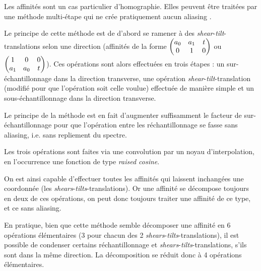 Les affinités sont un cas particulier d'homographie. Elles peuvent être traitées par une méthode multi-étape qui ne crée pratiquement aucun aliasing \cite{szeliski2010high}.

Le principe de cette méthode est de d'abord se ramener à des \emph{shear}-\emph{tilt}-translations selon une direction (affinités de la forme
$\begin{pmatrix} a_0 & a_1 & t\\ 0 & 1 & 0 \end{pmatrix}$ ou $\begin{pmatrix} 1 & 0 & 0\\ a_1 & a_0 & t \end{pmatrix}$). Ces opérations sont alors effectuées en trois étapes : un sur-échantillonnage dans la direction transverse, une opération \emph{shear}-\emph{tilt}-translation (modifié pour que l'opération soit celle voulue) effectuée de manière simple et un sous-échantillonnage dans la direction transverse.

Le principe de la méthode est en fait d'augmenter suffisamment le facteur de sur-échantillonnage pour que l'opération entre les réchantillonnage se fasse sans aliasing, i.e. sans repliement du spectre.

Les trois opérations sont faites via une convolution par un noyau d'interpolation, en l'occurrence une fonction de type \emph{raised cosine}.

On est ainsi capable d'effectuer toutes les affinités qui laissent inchangées une coordonnée (les \emph{shears}-\emph{tilts}-translations). Or une affinité se décompose toujours en deux de ces opérations, on peut donc toujours traiter une affinité de ce type, et ce sans aliasing.

En pratique, bien que cette méthode semble décomposer une affinité en 6 opérations élémentaires (3 pour chacun des 2 \emph{shears}-\emph{tilts}-translations), il est possible de condenser certains réchantillonnage et \emph{shears}-\emph{tilts}-translations, s'ils sont dans la même direction. La décomposition se réduit donc à 4 opérations élémentaires.

